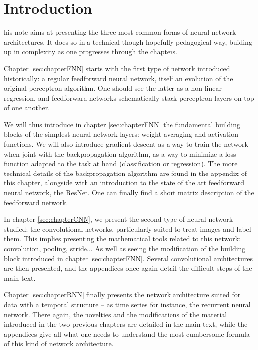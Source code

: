\chapter{Introduction}

his note aims at presenting the three most common forms of neural network architectures. It does so in a technical though hopefully pedagogical way, buiding up in complexity as one progresses through the chapters.

\vspace{0.2cm}

Chapter \ref{sec:chapterFNN} starts with the first type of network introduced historically: a regular feedforward neural network, itself an evolution of the original perceptron \cite{Rosenblatt58theperceptron:} algorithm. One should see the latter as a non-linear regression, and feedforward networks schematically stack perceptron layers on top of one another.

\vspace{0.2cm}

We will thus introduce in chapter \ref{sec:chapterFNN} the fundamental building blocks of the simplest neural network layers: weight averaging and activation functions. We will also introduce gradient descent as a way to train the network when joint with the backpropagation algorithm, as a way to minimize a loss function adapted to the task at hand (classification or regression). The more technical details of the backpropagation algorithm are found in the appendix of this chapter, alongside with an introduction to the state of the art feedforward neural network, the ResNet. One can finally find a short matrix description of the feedforward network.

\vspace{0.2cm}

In chapter \ref{sec:chapterCNN}, we present the second type of neural network studied: the convolutional networks, particularly suited to treat images and label them. This implies presenting the mathematical tools related to this network: convolution, pooling, stride... As well as seeing the modification of the building block introduced in chapter \ref{sec:chapterFNN}. Several convolutional architectures are then presented, and the appendices once again detail the difficult steps of the main text.

\vspace{0.2cm}

Chapter \ref{sec:chapterRNN} finally presents the network architecture suited for data with a temporal structure -- as time series for instance, the recurrent neural network. There again, the novelties and the modifications of the material introduced in the two previous chapters are detailed in the main text, while the appendices give all what one needs to understand the most cumbersome formula of this kind of network architecture.
